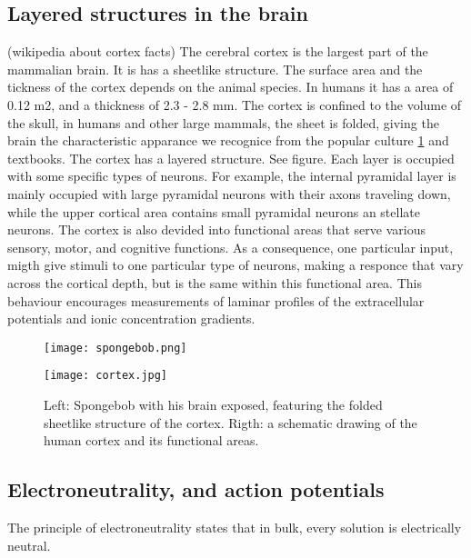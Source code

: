\documentclass{article}
\begin{document}
\subsection{Layered structures in the brain}
(wikipedia about cortex facts)
The cerebral cortex is the largest part of the mammalian brain. It is has a sheetlike structure. The surface area and the tickness of the cortex depends on the animal species. In humans it has a area of 0.12 m2, and a thickness of 2.3 - 2.8 mm. The cortex is confined to the volume of the skull, in humans and other large mammals, the sheet is folded, giving the brain the characteristic apparance we recognice from the popular culture \ref{fig:spongebob} and textbooks.  The cortex has a layered structure. See figure. Each layer is occupied with some specific types of neurons. For example, the internal pyramidal layer is mainly occupied with large pyramidal neurons with their axons traveling down, while the upper cortical area contains small pyramidal neurons an stellate neurons. The cortex is also devided into functional areas that serve various sensory, motor, and cognitive functions. As a consequence, one particular input, migth give stimuli to one particular type of neurons, making a responce that vary across the cortical depth, but is the same within this functional area. This behaviour encourages measurements of laminar profiles of the extracellular potentials and ionic concentration gradients.  


\begin{figure}[!tbp]
  \centering
  \begin{minipage}[b]{0.45\textwidth}
    \texttt{[image: spongebob.png]}
  \end{minipage}
  \begin{minipage}[b]{0.45\textwidth}
    \texttt{[image: cortex.jpg]}
  \end{minipage}  
   \caption{Left: Spongebob with his brain exposed, featuring the folded sheetlike structure of the cortex. Rigth: a schematic drawing of the human cortex and its functional areas.}
  \label{fig:spongebob}
\end{figure}

\subsection{Electroneutrality, and action potentials}
The principle of electroneutrality states that in bulk, every solution is electrically neutral. 
\end{document}
